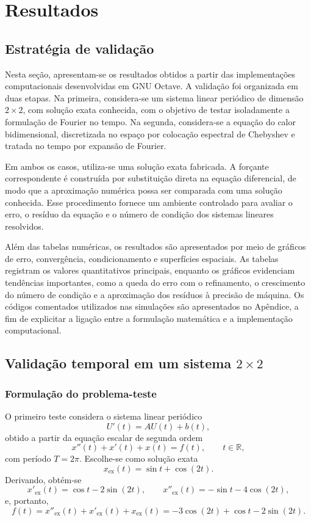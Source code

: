 \chapter{Resultados}

\section{Estratégia de validação}

Nesta seção, apresentam-se os resultados obtidos a partir das implementações computacionais desenvolvidas em GNU Octave. A validação foi organizada em duas etapas. Na primeira, considera-se um sistema linear periódico de dimensão \(2\times2\), com solução exata conhecida, com o objetivo de testar isoladamente a formulação de Fourier no tempo. Na segunda, considera-se a equação do calor bidimensional, discretizada no espaço por colocação espectral de Chebyshev e tratada no tempo por expansão de Fourier.

Em ambos os casos, utiliza-se uma solução exata fabricada. A forçante correspondente é construída por substituição direta na equação diferencial, de modo que a aproximação numérica possa ser comparada com uma solução conhecida. Esse procedimento fornece um ambiente controlado para avaliar o erro, o resíduo da equação e o número de condição dos sistemas lineares resolvidos.

Além das tabelas numéricas, os resultados são apresentados por meio de gráficos de erro, convergência, condicionamento e superfícies espaciais. As tabelas registram os valores quantitativos principais, enquanto os gráficos evidenciam tendências importantes, como a queda do erro com o refinamento, o crescimento do número de condição e a aproximação dos resíduos à precisão de máquina. Os códigos comentados utilizados nas simulações são apresentados no Apêndice, a fim de explicitar a ligação entre a formulação matemática e a implementação computacional.

\section{Validação temporal em um sistema \texorpdfstring{\(2\times2\)}{2x2}}

\subsection{Formulação do problema-teste}

O primeiro teste considera o sistema linear periódico
\[
U'(t)=AU(t)+b(t),
\]
obtido a partir da equação escalar de segunda ordem
\[
x''(t)+x'(t)+x(t)=f(t),
\qquad t\in\mathbb{R},
\]
com período \(T=2\pi\). Escolhe-se como solução exata
\[
x_{\mathrm{ex}}(t)=\sin t+\cos(2t).
\]
Derivando, obtém-se
\[
x'_{\mathrm{ex}}(t)=\cos t-2\sin(2t),
\qquad
x''_{\mathrm{ex}}(t)=-\sin t-4\cos(2t),
\]
e, portanto,
\[
f(t)=x''_{\mathrm{ex}}(t)+x'_{\mathrm{ex}}(t)+x_{\mathrm{ex}}(t)
=-3\cos(2t)+\cos t-2\sin(2t).
\]


